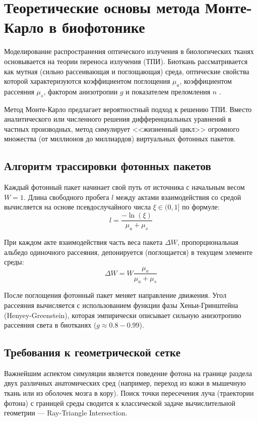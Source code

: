 \documentclass[a4paper,14pt]{article}
\begin{document}
\newpage
\section{Теоретические основы метода Монте-Карло в биофотонике}

Моделирование распространения оптического излучения в биологических тканях основывается на теории переноса излучения (ТПИ). Биоткань рассматривается как мутная (сильно рассеивающая и поглощающая) среда, оптические свойства которой характеризуются коэффициентом поглощения $\mu_a$, коэффициентом рассеяния $\mu_s$, фактором анизотропии $g$ и показателем преломления $n$ \cite{wang1995}. 

Метод Монте-Карло предлагает вероятностный подход к решению ТПИ. Вместо аналитического или численного решения дифференциальных уравнений в частных производных, метод симулирует <<жизненный цикл>> огромного множества (от миллионов до миллиардов) виртуальных фотонных пакетов. 

\subsection{Алгоритм трассировки фотонных пакетов}
Каждый фотонный пакет начинает свой путь от источника с начальным весом $W=1$. Длина свободного пробега $l$ между актами взаимодействия со средой вычисляется на основе псевдослучайного числа $\xi \in (0, 1]$ по формуле:
\begin{equation}
    l = \frac{-\ln(\xi)}{\mu_a + \mu_s}
\end{equation}

При каждом акте взаимодействия часть веса пакета $\Delta W$, пропорциональная альбедо одиночного рассеяния, депонируется (поглощается) в текущем элементе среды:
\begin{equation}
    \Delta W = W \frac{\mu_a}{\mu_a + \mu_s}
\end{equation}

После поглощения фотонный пакет меняет направление движения. Угол рассеяния вычисляется с использованием функции фазы Хеньи-Гринштейна (Henyey-Greenstein), которая эмпирически описывает сильную анизотропию рассеяния света в биотканях ($g \approx 0.8 - 0.99$).

\subsection{Требования к геометрической сетке}
Важнейшим аспектом симуляции является поведение фотона на границе раздела двух различных анатомических сред (например, переход из кожи в мышечную ткань или из оболочек мозга в кору). Поиск точки пересечения луча (траектории фотона) с границей среды сводится к классической задаче вычислительной геометрии — Ray-Triangle Intersection.
\end{document}
